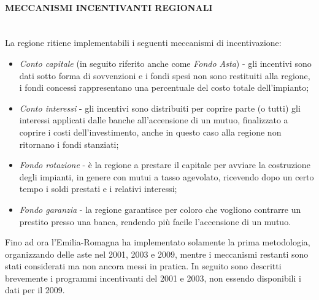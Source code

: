 \documentclass[12pt,a4paper,openright,twoside]{report}
\newcommand{\myparagraph}[1]{\paragraph{#1}\mbox{}\\}
\begin{document}
\myparagraph{MECCANISMI INCENTIVANTI REGIONALI}
La regione ritiene implementabili i seguenti meccanismi di incentivazione: 
\begin{itemize}
\item \emph{Conto capitale} (in seguito riferito anche come \emph{Fondo Asta}) - gli incentivi sono dati sotto forma di sovvenzioni e i fondi spesi non sono restituiti alla regione, i fondi concessi rappresentano una percentuale del costo totale dell'impianto;
\item \emph{Conto interessi} - gli incentivi sono distribuiti per coprire parte (o tutti) gli interessi applicati dalle banche all'accensione di un mutuo, finalizzato a coprire i costi dell'investimento, anche in questo caso alla regione non ritornano i fondi stanziati;
\item \emph{Fondo rotazione} - è la regione a prestare il capitale per avviare la costruzione degli impianti, in genere con mutui a tasso agevolato, ricevendo dopo un certo tempo i soldi prestati e i relativi interessi; 
\item \emph{Fondo garanzia} - la regione garantisce per coloro che vogliono contrarre un prestito presso una banca, rendendo più facile l'accensione di un mutuo.
\end{itemize}
Fino ad ora l'Emilia-Romagna ha implementato solamente la prima metodologia, organizzando delle aste nel 2001, 2003 e 2009, mentre i meccanismi restanti sono stati considerati ma non ancora messi in pratica. In seguito sono descritti brevemente i programmi incentivanti del 2001 e 2003, non essendo disponibili i dati per il 2009.
\end{document}
